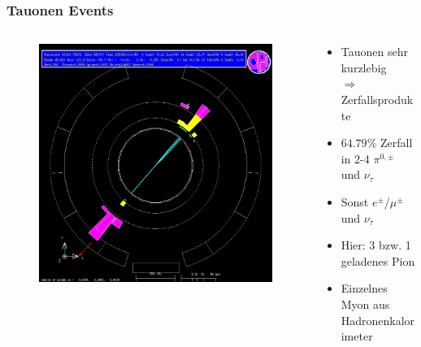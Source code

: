 \begin{frame}
	\frametitle{Tauonen Events}
	\begin{columns}[T] %
		\begin{column}{.54\textwidth}
			\begin{figure}
				\centering
				\includegraphics[width=1.0\linewidth]{graphics/tauonopal}
			\end{figure}
		\end{column}%
		\hfill%
		\begin{column}{.42\textwidth}
			\begin{center}
				\begin{itemize}
					\item Tauonen sehr kurzlebig \\$\Rightarrow$ Zerfallsprodukte
					\item $64.79\%$ Zerfall in 2-4 $\pi^{0,\pm}$ und $\nu_\tau$
					\item Sonst $e^{\pm}$/$\mu^{\pm}$ und $\nu_\tau$
					\item Hier: 3 bzw. 1 geladenes Pion
					\item Einzelnes Myon aus Hadronenkalorimeter
				\end{itemize}
			\end{center}
		\end{column}%
	\end{columns}
	
\end{frame}
